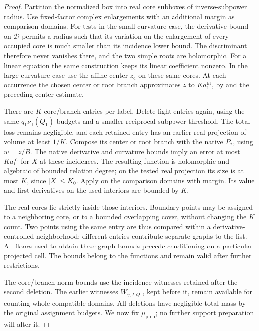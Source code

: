\begin{proof}
Partition the normalized box into real core subboxes of
inverse-subpower radius.  Use fixed-factor complex enlargements
with an additional margin as comparison domains. For tests in the
small-curvature case, the derivative bound on \(\mathcal D\) permits
a radius such that its variation on the enlargement of every occupied
core is much smaller than its incidence lower bound. The discriminant
therefore never vanishes there, and the two simple roots are
holomorphic. For a linear equation the same construction keeps its
linear coefficient nonzero. In the large-curvature case use the affine
center \(z_{\mathrm c}\) on these same cores. At each occurrence the
chosen center or root branch approximates \(z\) to
\(Ka_1^{\mathrm{fit}}\), by  and the
preceding center estimate.

There are \(K\) core/branch entries per label.  Delete light entries
again, using the same \(q_1\nu_\gamma(Q_1)\) budgets and a smaller
reciprocal-subpower threshold.  The total loss remains negligible,
and each retained entry has an earlier real projection of volume
at least \(1/K\).  Compose its center or root branch with the native
\(P_*\), using \(w=z/B\).  The native derivative and curvature
bounds imply an error at most \(Ka_1^{\mathrm{fit}}\) for \(X\)
at these incidences.  The resulting function is holomorphic and
algebraic of bounded relation degree; on the tested real projection
its size is at most \(K\), since \(|X|\le K_0\).
Apply  on the comparison domains with
margin.  Its value and first derivatives on the used interiors
are bounded by \(K\).

The real cores lie strictly inside those interiors.  Boundary points
may be assigned to a neighboring core, or to a bounded overlapping
cover, without changing the \(K\) count.  Two points using the same
entry are thus compared within a derivative-controlled neighborhood;
different entries contribute separate graphs to the list.
All floors used to obtain these graph bounds precede conditioning
on a particular projected cell.  The bounds belong to the functions
and remain valid after further restrictions.


The core/branch norm bounds use the incidence witnesses retained after
the second deletion.  The earlier witnesses \(W_{\gamma,I,Q_1}\), kept
before it, remain available for counting whole compatible domains.
All deletions have negligible total mass by the original assignment
budgets.  We now fix \(\mu_{\mathrm{prep}}\); no further support
preparation will alter it.
\end{proof}

